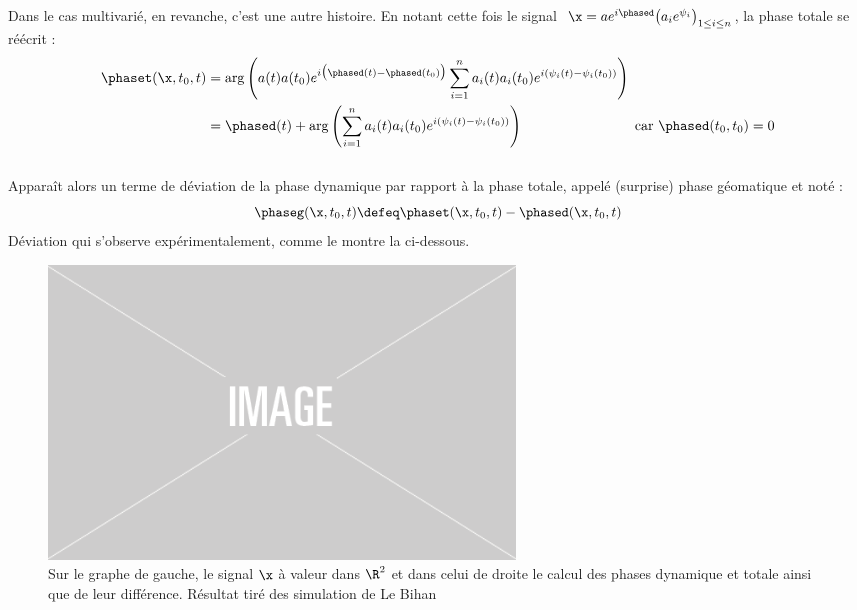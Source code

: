 Dans le cas multivarié, en revanche, c'est une autre histoire. En notant cette fois le signal $\ \x = ae^{i\phased} \big( a_ie^{\psi_i} \big)_{1\leq i\leq n}$, la phase totale se réécrit :
\begin{equation}\label{eq:diff_phases_t/d}
	\begin{aligned}
		\phaset(\x,t_0, t) &= \arg \left(a(t)a(t_0) e^{i\big(\phased(t) - \phased(t_0)\big)}\sum_{i=1}^n a_i(t)a_i(t_0)e^{i(\psi_i(t)-\psi_i(t_0))} \right) \\
		&= \phased(t) + \arg \left(\sum_{i=1}^n a_i(t)a_i(t_0)e^{i(\psi_i(t)-\psi_i(t_0))} \right)  \qquad\qquad\qquad\qquad \text{car } \phased(t_0,t_0) = 0
	\end{aligned}
\end{equation}
\\
Apparaît alors un terme de déviation de la phase dynamique par rapport à la phase totale, appelé (surprise) phase géomatique et noté :
\begin{equation}\label{eq:phase_g}
	\phaseg(\x,t_0,t) \defeq \phaset(\x, t_0,t) - \phased(\x, t_0,t)
\end{equation}
Déviation qui s'observe expérimentalement, comme le montre la  ci-dessous.
\\
\begin{figure}[h]
	\includegraphics[width=0.6\textwidth]{fig/placeholder}
	\caption[Déviation de la phase dynamique par rapport à la phase totale]{Sur le graphe de gauche, le signal $\x$ à valeur dans $\R^2$ et dans celui de droite le calcul des phases dynamique et totale ainsi que de leur différence. Résultat tiré des simulation de Le Bihan \etal~\cite{le_bihan_modephysiques_2023}}
	\label{fig:calc_diff_phases}
\end{figure}
\\

